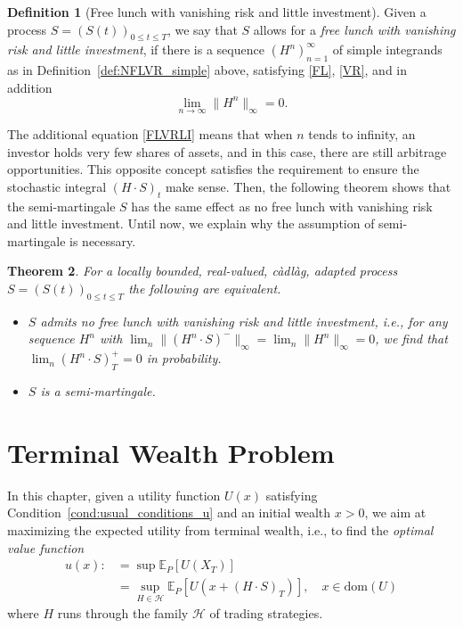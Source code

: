 \documentclass[a4paper]{article}
\newtheorem{theorem}{Theorem}[section]
\theoremstyle{definition}
\newtheorem{definition}[theorem]{Definition}
\numberwithin{equation}{section}
\begin{document}
\begin{definition}[Free lunch with vanishing risk and little investment]
Given a process $S=(S(t))_{0\leq t\leq T}$, we say that $S$ allows for a \emph{free lunch with vanishing risk and little investment}, if there is a sequence $(H^n)^\infty_{n=1}$ of simple integrands as in Definition~\ref{def:NFLVR_simple} above, satisfying \eqref{FL}, \eqref{VR}, and in addition
\begin{equation}\label{FLVRLI}
\lim_{n\rightarrow\infty}\|H^n\|_\infty=0.
\end{equation}
\end{definition}
The additional equation \eqref{FLVRLI} means that when $n$ tends to infinity, an investor holds very few shares of assets, and in this case, there are still arbitrage opportunities. This opposite concept satisfies the requirement to ensure the stochastic integral $(H\cdot S)_t$ make sense. Then, the following theorem shows that the semi-martingale $S$ has the same effect as no free lunch with vanishing risk and little investment. Until now, we explain why the assumption of semi-martingale is necessary.
\begin{theorem}
For a locally bounded, real-valued, c\`adl\`ag, adapted process $S=(S(t))_{0\leq t\leq T}$ the following are equivalent.
\begin{itemize}
\item $S$ admits no free lunch with vanishing risk and little investment, i.e., for any sequence $H^n$ with $\lim_n\|(H^n\cdot S)^-\|_\infty=\lim_n\|H^n\|_\infty=0$, we find that $\lim_n(H^n\cdot S)^+_T=0$ in probability.
\item $S$ is a semi-martingale.
\end{itemize}
\end{theorem}




\section{Terminal Wealth Problem}\label{ch:terminal_wealth}
In this chapter, given a utility function $U(x)$ satisfying Condition~\ref{cond:usual_conditions_u} and an initial wealth $x>0$, we aim at maximizing the expected utility from terminal wealth, i.e., to find the \emph{optimal value function}
\begin{equation}\label{prob:wealth}
\begin{aligned}
u(x):&=\sup\mathbb E_P[U(X_T)]\\
&=\sup_{H\in\mathcal H}\mathbb E_P[U(x+(H\cdot S)_T)],\quad x\in\mathrm{dom}(U)
\end{aligned}
\end{equation}
where $H$ runs through the family $\mathcal H$ of trading strategies.
\end{document}
